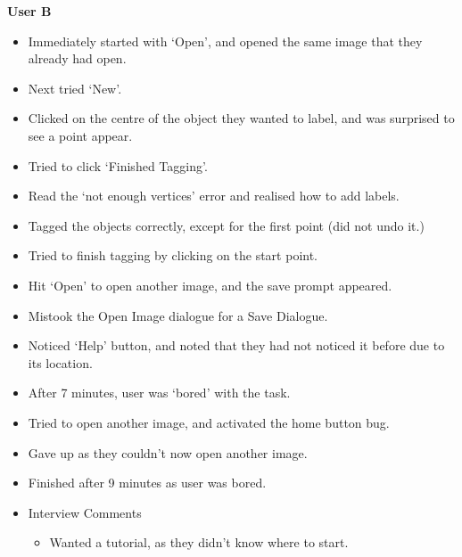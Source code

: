 \documentclass[11pt,twocolumn]{article}
\begin{document}
\textbf{User B}
\begin{itemize}
\item Immediately started with `Open', and opened the same image that they already had open.
\item Next tried `New'.
\item Clicked on the centre of the object they wanted to label, and was surprised to see a point appear.
\item Tried to click `Finished Tagging'.
\item Read the `not enough vertices' error and realised how to add labels.
\item Tagged the objects correctly, except for the first point (did not undo it.)
\item Tried to finish tagging by clicking on the start point.
\item Hit `Open' to open another image, and the save prompt appeared.
\item Mistook the Open Image dialogue for a Save Dialogue. 
\item Noticed `Help' button, and noted that they had not noticed it before due to its location.
\item After 7 minutes, user was `bored' with the task.
\item Tried to open another image, and activated the home button bug.
\item Gave up as they couldn't now open another image.
\item Finished after 9 minutes as user was bored.
\item Interview Comments
\begin{itemize}
\item Wanted a tutorial, as they didn't know where to start.
\end{itemize}
\end{itemize}
\end{document}
